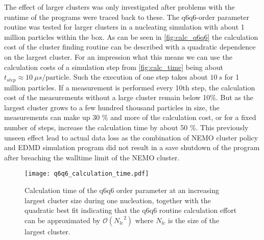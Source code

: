 The effect of larger clusters was only investigated after problems with the runtime of the programs were traced back to these. The q6q6-order parameter routine was tested for larger clusters in a nucleating simulation with about 1 million particles within the box. As can be seen in \autoref{fig:calc_q6q6} the calculation cost of the cluster finding routine can be described with a quadratic dependence on the largest cluster. For an impression what this means we can use the calculation costs of a simulation step from \autoref{fig:calc_time} being about $t_{step} \approx \SI{10}{\mu s \per \text{particle} }$. Such the execution of one step takes about $\SI{10}{s}$ for 1 million particles. If a measurement is performed every 10th step, the calculation cost of the measurements without a large cluster remain below 10\%. But as the largest cluster grows to a few hundred thousand particles in size, the measurements can make up 30 \% and more of the calculation cost, or for a fixed number of steps, increase the calculation time by about 50 \%. This previously unseen effect lead to actual data loss as the combination of NEMO cluster policy and EDMD simulation program did not result in a save shutdown of the program after breaching the walltime limit of the NEMO cluster.\\

\begin{figure}[h!]
\centering
\texttt{[image: q6q6\_calculation\_time.pdf]}
\caption{Calculation time of the q6q6 order parameter at an increasing largest cluster size during one nucleation, together with the quadratic best fit indicating that the q6q6 routine calculation effort can be approximated by $\mathcal{O}({N_{lc}}^2)$ where $N_{lc}$ is the size of the largest cluster.}
\label{fig:calc_q6q6}
\end{figure}


